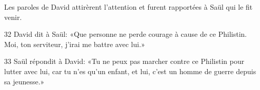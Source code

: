 
Les paroles de David attirèrent l’attention et furent rapportées à Saül qui le fit venir.

32 David dit à Saül: «Que personne ne perde courage à cause de ce Philistin. Moi, ton serviteur, j’irai me battre avec lui.»

33 Saül répondit à David: «Tu ne peux pas marcher contre ce Philistin pour lutter avec lui, car tu n’es qu’un enfant, et lui, c’est un homme de guerre depuis sa jeunesse.»
